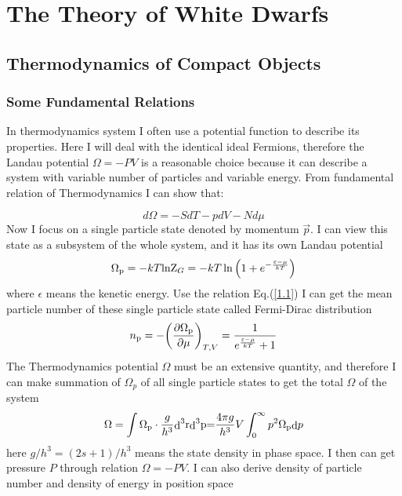 \documentclass[reprint]{revtex4-1}
\begin{document}
\section{The Theory of White Dwarfs}
\subsection{Thermodynamics of Compact Objects}
\subsubsection{Some Fundamental Relations}
In thermodynamics system I often use a potential function to describe its properties. Here I will deal with the identical ideal Fermions, therefore the Landau potential $\Omega  =  - PV$ is a reasonable choice because it can describe a system with variable number of particles and variable energy. From fundamental relation of Thermodynamics I can show that:\par
\begin{equation}
d \Omega  =  - Sd T - pd V - Nd \mu  \label{1.1}
\end{equation}
Now I focus on a single particle state denoted by momentum $\vec{p}$. I can view this state as a subsystem of the whole system, and it has its own Landau potential
\begin{equation}
{\Omega _{\rm{p}}} =  - kT{{\mathop{\rm lnZ}\nolimits} _G} =  - kT\ln \left( {1 + {e^{ - \frac{{\varepsilon  - \mu }}{{kT}}}}} \right) \label{1.2}
\end{equation}
where $\epsilon$ means the kenetic energy. Use the relation Eq.(\ref{1.1}) I can get the mean particle number of these single particle state called Fermi-Dirac distribution
\begin{equation}
{n_{\rm{p}}} =  - {\left( {\frac{{\partial {\Omega _{\rm{p}}}}}{{\partial \mu }}} \right)_{T,V}} = \frac{1}{{{e^{\frac{{\varepsilon  - \mu }}{{kT}}}} + 1}} \label{1.3}
\end{equation}
The Thermodynamics potential $\Omega$  must be an extensive quantity, and therefore I can make summation of $\Omega_p$  of all single particle states to get the total $\Omega$  of the system
\begin{equation}
\Omega  = \int {{\Omega _{\rm{p}}} \cdot \frac{g}{{{h^3}}}{\mathop{\rm d}\nolimits}^3 {\rm{r}}{\mathop{\rm d}\nolimits}^3 {\rm{p}}} {\rm{ = }}\frac{{4\pi g}}{{{h^3}}}V\int_0^\infty  {{p^2}{\Omega _{\rm{p}}}{\mathop{\rm d}\nolimits} p}  \label{1.4}
\end{equation}
here $g/{h^3} = \left( {2s + 1} \right)/{h^3}$ means the state density in phase space. I then can get pressure $P$  through relation $\Omega  =  - PV$. I can also derive density of particle number and density of energy in position space
\end{document}
